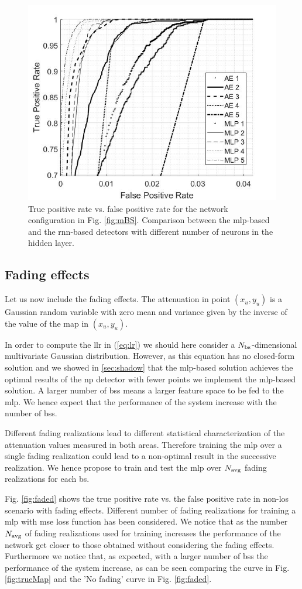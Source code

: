 \documentclass[draftcls,onecolumn,12pt]{IEEEtran}
\begin{document}
\begin{figure}
    \centering
    \includegraphics[width=0.5\columnwidth]{RNNvsMLPnNeur.jpg}
    \caption{True positive rate vs. false positive rate for the network configuration in Fig. \ref{fig:mBS}. Comparison between the \ac{mlp}-based and the \ac{rnn}-based detectors with different number of neurons in the hidden layer.}
    \label{fig:rnnMLP}
\end{figure}


\subsection{Fading effects}
Let us now include the fading effects. The attenuation in point $(x_u,y_u)$ is a Gaussian random variable with zero mean and variance given by the inverse of the value of the map in $(x_u,y_u)$.


In order to compute the \ac{llr} in (\ref{eq:lr}) we should here consider a $N_{\rm bs}$-dimensional multivariate Gaussian distribution. However, as this equation has no closed-form solution and we showed in \ref{sec:shadow} that the \ac{mlp}-based solution achieves the optimal results of the \ac{np} detector with fewer points we implement the \ac{mlp}-based solution. A larger number of \acp{bs} means a larger feature space to be fed to the \ac{mlp}. We hence expect that the performance of the system increase with the number of \acp{bs}.

Different fading realizations lead to different statistical characterization of the attenuation values measured in both areas. Therefore training the \ac{mlp} over a single fading realization could lead to a non-optimal result in the successive realization. We hence propose to train and test the \ac{mlp} over $N_{\rm avg}$ fading realizations for each \ac{bs}.

Fig. \ref{fig:faded} shows the true positive rate vs. the false positive rate in non-\ac{los} scenario with fading effects. Different number of fading realizations for training a \ac{mlp} with \ac{mse} loss function has been considered. We notice that as the number $N_{\rm avg}$ of fading realizations used for training increases the performance of the network get closer to those obtained without considering the fading effects. Furthermore we notice that, as expected, with a larger number of \acp{bs} the performance of the system increase, as can be seen comparing the curve in Fig. \ref{fig:trueMap} and the 'No fading' curve in Fig. \ref{fig:faded}.
\end{document}
